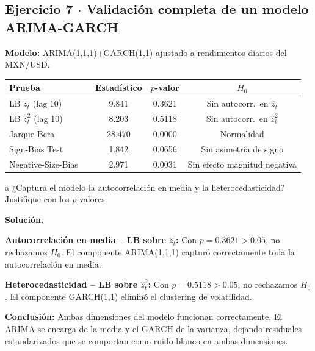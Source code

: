 \documentclass[11pt,a4paper]{article}
\begin{document}
\subsection*{Ejercicio 7 \texorpdfstring{$\cdot$}{·} Validación completa de un modelo ARIMA-GARCH}

\textbf{Modelo:} ARIMA(1,1,1)+GARCH(1,1) ajustado a rendimientos diarios del MXN/USD.

\begin{center}
\begin{tabular}{@{}llccc@{}}
\toprule
Prueba & & Estadístico & $p$-valor & $H_0$ \\
\midrule
LB $\hat{z}_t$ (lag 10)   & & 9.841  & 0.3621 & Sin autocorr.\ en $\hat{z}_t$ \\
LB $\hat{z}_t^2$ (lag 10) & & 8.203  & 0.5118 & Sin autocorr.\ en $\hat{z}_t^2$ \\
Jarque-Bera               & & 28.470 & 0.0000 & Normalidad \\
Sign-Bias Test            & & 1.842  & 0.0656 & Sin asimetría de signo \\
Negative-Size-Bias        & & 2.971  & 0.0031 & Sin efecto magnitud negativa \\
\bottomrule
\end{tabular}
\end{center}

\begin{cajaInciso}{a}
¿Captura el modelo la autocorrelación en media y la heterocedasticidad? Justifique con los $p$-valores.
\end{cajaInciso}

\textbf{Solución.}

\textbf{Autocorrelación en media -- LB sobre $\hat{z}_t$:} Con $p=0.3621>0.05$, no rechazamos $H_0$. El componente ARIMA(1,1,1) capturó correctamente toda la autocorrelación en media.

\textbf{Heterocedasticidad -- LB sobre $\hat{z}_t^2$:} Con $p=0.5118>0.05$, no rechazamos $H_0$. El componente GARCH(1,1) eliminó el clustering de volatilidad.

\textbf{Conclusión:} Ambas dimensiones del modelo funcionan correctamente. El ARIMA se encarga de la media y el GARCH de la varianza, dejando residuales estandarizados que se comportan como ruido blanco en ambas dimensiones.
\end{document}
